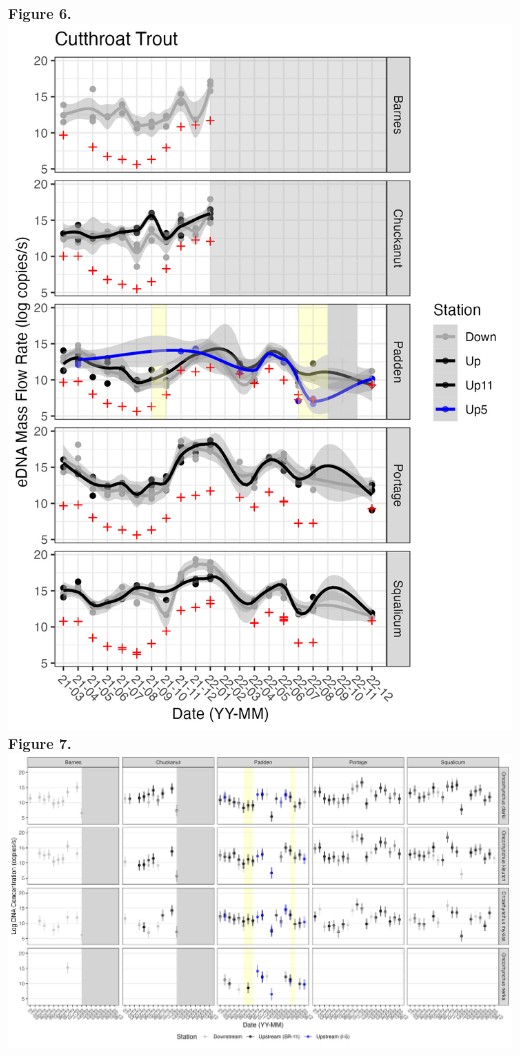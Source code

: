 \documentclass[
]{article}
\begin{document}
\newpage \textbf{Figure 6.}
\includegraphics{../Output/Figures/modeled_cut_qpcr_updown_flowcorrected.png}
\newpage \textbf{Figure 7.}
\includegraphics{../Output/Figures/multispeciesTrends_flowcorrected.png}
\end{document}

